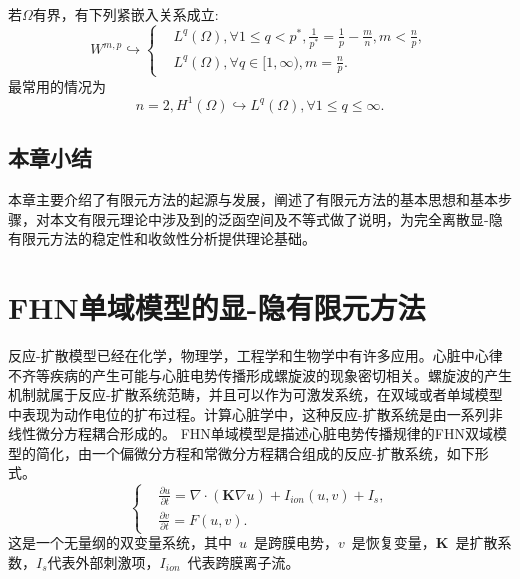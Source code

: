 \documentclass[twoside,UTF8]{nputhesis}
\begin{document}
\begin{Definition}
[紧嵌入定理]{
	若$\Omega$有界，有下列紧嵌入关系成立:
	\begin{equation*}
	W^{m,p}\hookrightarrow\left\{\begin{aligned}&L^{q}(\Omega), \forall1\leq q<p^*, \frac{1}{p^*}=\frac{1}{p}-\frac{m}{n}, m<\frac{n}{p},
	\\&L^q(\Omega),\forall q\in[1,\infty), m=\frac{n}{p}.\end{aligned}\right.
	\end{equation*}
	最常用的情况为
	\begin{equation*}
	n=2, H^1(\Omega)\hookrightarrow L^q(\Omega), \forall 1\leq q\leq\infty.
	\end{equation*}
}
\end{Definition}




\section{本章小结}
本章主要介绍了有限元方法的起源与发展，阐述了有限元方法的基本思想和基本步骤，对本文有限元理论中涉及到的泛函空间及不等式做了说明，为完全离散显-隐有限元方法的稳定性和收敛性分析提供理论基础。

\chapter{FHN单域模型的显-隐有限元方法}

反应-扩散模型已经在化学，物理学，工程学和生物学中有许多应用\cite{ouyang2000}。心脏中心律不齐等疾病的产生可能与心脏电势传播形成螺旋波的现象密切相关。螺旋波的产生机制就属于反应-扩散系统范畴，并且可以作为可激发系统，在双域或者单域模型中表现为动作电位的扩布过程。计算心脏学中，这种反应-扩散系统是由一系列非线性微分方程耦合形成的。
FHN单域模型是描述心脏电势传播规律的FHN双域模型的简化，由一个偏微分方程和常微分方程耦合组成的反应-扩散系统，如下形式\cite{Belhamadia2009}。
\begin{equation}
\left\{\begin{aligned}&\frac{\partial u}{\partial t}=\nabla\cdot(\textbf{K}\nabla u)+I_{ion}(u,v)+I_s,\\&\frac{\partial v}{\partial t}=F(u,v).\end{aligned}\right.
\label{system}
\end{equation}
这是一个无量纲的双变量系统，其中~$u$~是跨膜电势，$v$~是恢复变量，$\textbf{K}$~是扩散系数，$I_s$代表外部刺激项，$I_{ion}$~代表跨膜离子流。%
\end{document}
